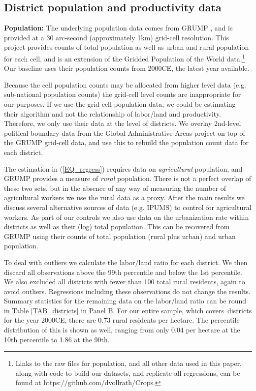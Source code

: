 \documentclass[11pt]{article}
\begin{document}
\subsection{District population and productivity data}

\noindent\textbf{Population:} The underlying population data comes from GRUMP \citep{grump2011}, and is provided at a 30 arc-second (approximately 1km) grid-cell resolution. This project provides counts of total population as well as urban and rural population for each cell, and is an extension of the Gridded Population of the World data.\footnote{Links to the raw files for population, and all other data used in this paper, along with code to build our datasets, and replicate all regressions, can be found at https://github.com/dvollrath/Crops.} Our baseline uses their population counts from 2000CE, the latest year available.

Because the cell population counts may be allocated from higher level data (e.g. sub-national population counts) the grid-cell level counts are inappropriate for our purposes. If we use the grid-cell population data, we could be estimating their algorithm and not the relationship of labor/land and productivity. Therefore, we only use their data at the level of districts. We overlay 2nd-level political boundary data from the Global Administrative Areas project \citep{gadm} on top of the GRUMP grid-cell data, and use this to rebuild the population count data for each district.

The estimation in (\ref{EQ_regress}) requires data on \textit{agricultural} population, and GRUMP provides a measure of \textit{rural} population. There is not a perfect overlap of these two sets, but in the absence of any way of measuring the number of agricultural workers we use the rural data as a proxy. After the main results we discuss several alternative sources of data (e.g. IPUMS) to control for agricultural workers. As part of our controls we also use data on the urbanization rate within districts as well as their (log) total population. This can be recovered from GRUMP using their counts of total population (rural plus urban) and urban population.

To deal with outliers we calculate the labor/land ratio for each district. We then discard all observations above the 99th percentile and below the 1st percentile. We also excluded all districts with fewer than 100 total rural residents, again to avoid outliers. Regressions including these observations do not change the results. Summary statistics for the remaining data on the labor/land ratio can be round in Table \ref{TAB_districts} in Panel B. For our entire sample, which covers\districts \ districts for the year 2000CE, there are 0.73 rural residents per hectare. The percentile distribution of this is shown as well, ranging from only 0.04 per hectare at the 10th percentile to 1.86 at the 90th. 
\end{document}
